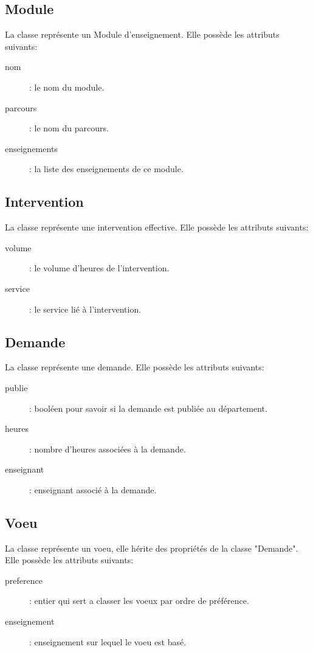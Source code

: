     \subsection{Module}
    	La classe  représente un Module d'enseignement. Elle possède les attributs suivants:
    	\begin{description}
    		\item[nom]: le nom du module. 
    		\item[parcours]: le nom du parcours. 
    		\item[enseignements]: la liste des enseignements de ce module.
    	\end{description}

    \subsection{Intervention}
    	La classe  représente une intervention effective. Elle possède les attributs suivants:
    	\begin{description}
    		\item[volume]: le volume d'heures de l'intervention. 
    		\item[service]: le service lié à l'intervention.
    	\end{description}

    \subsection{Demande}
    	La classe  représente une demande. Elle possède les attributs suivants:
    	\begin{description}
    		\item[publie]: booléen pour savoir si la demande est publiée au département.
    		\item[heures]: nombre d'heures associées à la demande. 
    		\item[enseignant]: enseignant associé à la demande.
    	\end{description}
    	
    \subsection{Voeu}
    	La classe  représente un voeu, elle hérite des propriétés de la classe "Demande". Elle possède les attributs suivants:
    	\begin{description}
    		\item[preference]: entier qui sert a classer les voeux par ordre de préférence. 
    		\item[enseignement]: enseignement sur lequel le voeu est basé.  
    	\end{description}
    	
